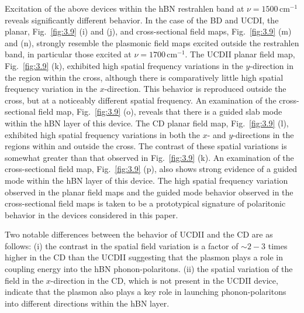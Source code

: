 \documentclass[preprint,
amsmath,amssymb,
aip,
jap,
floatfix,]{revtex4-2}
\begin{document}
				Excitation of the above devices within the hBN restrahlen band at $\nu = 1500 \, \mathrm{cm}^{-1}$ reveals significantly different behavior. In the case of the BD and UCDI, the planar, Fig.~\ref{fig:3.9} (i) and (j), and cross-sectional field maps, Fig.~\ref{fig:3.9} (m) and (n), strongly resemble the plasmonic field maps excited outside the restrahlen band, in particular those excited at $\nu = 1700 \, \mathrm{cm}^{-1}$. The UCDII planar field map, Fig.~\ref{fig:3.9} (k), exhibited high spatial frequency variations in the $y$-direction in the region within the cross, although there is comparatively little high spatial frequency variation in the $x$-direction. This behavior is reproduced outside the cross, but at a noticeably different spatial frequency. An examination of the cross-sectional field map, Fig.~\ref{fig:3.9} (o), reveals that there is a guided slab mode within the hBN layer of this device. The CD planar field map, Fig.~\ref{fig:3.9} (l), exhibited high spatial frequency variations in both the $x$- and $y$-directions in the regions within and outside the cross. The contrast of these spatial variations is somewhat greater than that observed in Fig.~\ref{fig:3.9} (k). An examination of the cross-sectional field map, Fig.~\ref{fig:3.9} (p), also shows strong evidence of a guided mode within the hBN layer of this device. The high spatial frequency variation observed in the planar field maps and the guided mode behavior observed in the cross-sectional field maps is taken to be a prototypical signature of polaritonic behavior in the devices considered in this paper.

				Two notable differences between the behavior of UCDII and the CD are as follows: (i) the contrast in the spatial field variation is a factor of $\sim 2-3$ times higher in the CD than the UCDII suggesting that the plasmon plays a role in coupling energy into the hBN phonon-polaritons. (ii) the spatial variation of the field in the $x$-direction in the CD, which is not present in the UCDII device, indicate that the plasmon also plays a key role in launching phonon-polaritons into different directions within the hBN layer.
\end{document}
